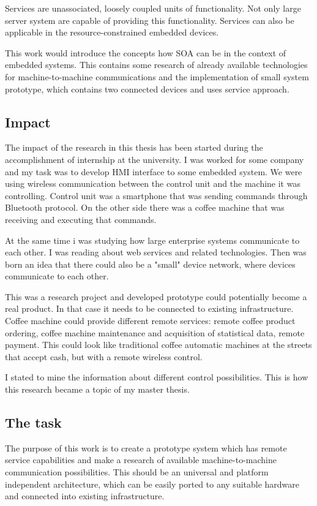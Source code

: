 Services are unassociated, loosely coupled units of functionality.
Not only large server system are capable of providing this functionality.
Services can also be applicable in the resource-constrained embedded devices.

This work would introduce the concepts how \gls{SOA} can be in the  context  of 
embedded  systems.
This contains some research of already available technologies for
machine-to-machine communications and the implementation of small system
prototype, which contains two connected devices and uses service approach.

\subsection{Impact}
The impact of the research in this thesis has been started during the accomplishment of internship at the university. 
I was worked for some company and my task was to develop \gls{HMI} interface to some embedded system.
We were using wireless communication between the control unit and the machine it was controlling.
Control unit was a smartphone that was sending commands through Bluetooth protocol.
On the other side there was a coffee machine that was receiving and executing that commands.

At the same time i was studying how large enterprise systems communicate to each other.
I was reading about web services and related technologies.
Then was born an idea that there could also be a "small" device network, where
devices communicate to each other.

This was a research project and developed prototype could potentially become a real product.
In that case it needs to be connected to existing infrastructure.
Coffee machine could provide different remote services: remote coffee product
ordering, coffee machine maintenance and acquisition of statistical data, remote
payment.
This could look like traditional coffee automatic machines at the streets that
accept cash, but with a remote wireless control.

I stated to mine the information about different control possibilities.
This is how this research became a topic of my master thesis. 

\subsection{The task}

The purpose of this work is to create a prototype system which has remote
service capabilities and make a research of available machine-to-machine
communication possibilities.
This should be an universal and platform independent architecture, which can be easily ported to any suitable hardware and connected
into existing infrastructure. 

